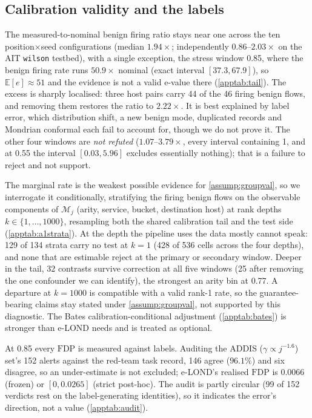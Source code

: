 \documentclass[conference]{IEEEtran}
\newcommand{\FDP}{\mathrm{FDP}}
\begin{document}
\subsection{Calibration validity and the labels}\label{sec:tail}

The measured-to-nominal benign firing ratio stays near one across the ten position$\times$seed
configurations (median $1.94\times$; independently $0.86$--$2.03\times$ on the AIT \texttt{wilson}
testbed), with a single exception, the stress window 0.85, where the benign firing rate runs $50.9\times$
nominal (exact interval $[37.3,67.9]$), so $\mathbb E[e]\approx51$ and the evidence is not a valid e-value
there (\cref{apptab:tail}). The excess is sharply localised: three host pairs carry 44 of the 46 firing
benign flows, and removing them restores the ratio to $2.22\times$. It is best explained by label error,
which distribution shift, a new benign mode, duplicated records and Mondrian conformal each fail to
account for, though we do not prove it. The other four windows are \emph{not refuted} ($1.07$--$3.79\times$,
every interval containing 1, and at 0.55 the interval $[0.03,5.96]$ excludes essentially nothing); that
is a failure to reject and not support.

The marginal rate is the weakest possible evidence for \cref{assump:groupval}, so we interrogate it
conditionally, stratifying the firing benign flows on the observable components of $\mathcal M_j$ (arity,
service, bucket, destination host) at rank depths $k\in\{1,\ldots,1000\}$, resampling both the shared
calibration tail and the test side (\cref{apptab:a1strata}). At the depth the pipeline uses the data
mostly cannot speak: 129 of 134 strata carry no test at $k=1$ (428 of 536 cells across the four depths),
and none that are estimable reject at the primary or secondary window. Deeper in the tail, 32 contrasts
survive correction at all five windows (25 after removing the one confounder we can identify), the
strongest an arity bin at 0.77. A departure at $k=1000$ is compatible with a valid rank-1 rate, so the
guarantee-bearing claims stay stated under \cref{assump:groupval}, not supported by this diagnostic. The
Bates calibration-conditional adjustment (\cref{apptab:bates}) is stronger than e-LOND needs and is
treated as optional.



At 0.85 every $\FDP$ is measured against labels. Auditing the ADDIS ($\gamma\propto j^{-1.6}$) set's 152
alerts against the red-team task record, 146 agree ($96.1\%$) and six disagree, so an under-estimate is
not excluded; e-LOND's realised $\FDP$ is $0.0066$ (frozen) or $[0,0.0265]$ (strict post-hoc). The audit
is partly circular (99 of 152 verdicts rest on the label-generating identities), so it indicates the
error's direction, not a value (\cref{apptab:audit}).
\end{document}

